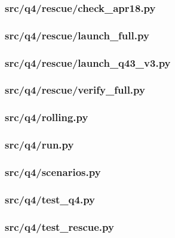 \documentclass[zihao=-4,a4paper,UTF8,fontset=none]{ctexart}
\begin{document}
\subsubsection*{src/q4/rescue/check\_apr18.py}


\subsubsection*{src/q4/rescue/launch\_full.py}


\subsubsection*{src/q4/rescue/launch\_q43\_v3.py}


\subsubsection*{src/q4/rescue/verify\_full.py}


\subsubsection*{src/q4/rolling.py}


\subsubsection*{src/q4/run.py}


\subsubsection*{src/q4/scenarios.py}


\subsubsection*{src/q4/test\_q4.py}


\subsubsection*{src/q4/test\_rescue.py}

\end{document}
